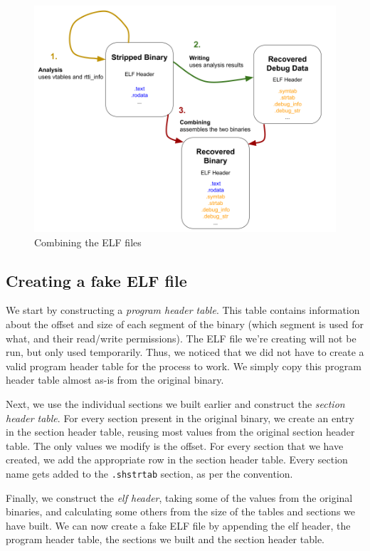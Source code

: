 \documentclass[a4paper,11pt,oneside]{report}
\begin{document}
\begin{figure}

\includegraphics[width=16cm]{recover.png}
\caption{Combining the ELF files}
\label{recovergraph}

\end{figure}

\subsection{Creating a fake ELF file}

We start by constructing a \emph{program header table}.
This table contains information about the offset and size of each segment of 
the binary (which segment is used for what, and their read/write permissions).
The ELF file we're creating will not be run, but only used temporarily.
Thus, we noticed that we did not have to create a valid program header table 
for the process to work.
We simply copy this program header table almost as-is from the original binary.

Next, we use the individual sections we built earlier and construct the 
\emph{section header table}.
For every section present in the original binary, we create an entry in the 
section header table, reusing most values from the original section header 
table.
The only values we modify is the offset.
For every section that we have created, we add the appropriate row in the 
section header table.
Every section name gets added to the \texttt{.shstrtab} section, as per the 
convention.

Finally, we construct the \emph{elf header}, taking some of the values from 
the original binaries, and calculating some others from the size of the tables 
and sections we have built.
We can now create a fake ELF file by appending the elf header, the program 
header table, the sections we built and the section header table.
\end{document}
